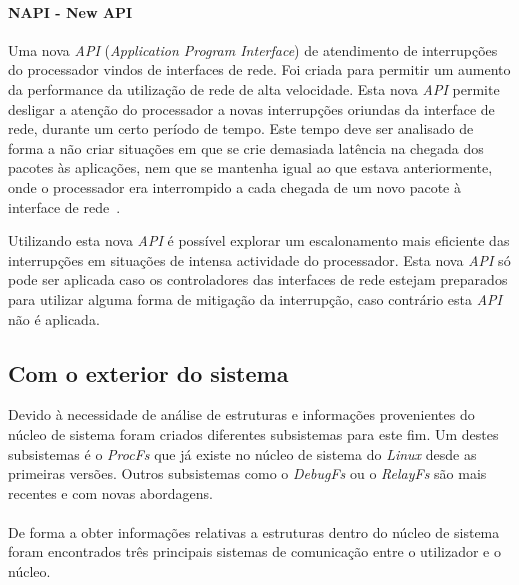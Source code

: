 \paragraph*{NAPI - New API}\label{par:NAPI}

Uma nova \textit{API} (\textit{Application Program Interface}) de atendimento de interrupções do processador vindos de interfaces de rede.
Foi criada para permitir um aumento da performance da utilização de rede de alta velocidade.
Esta nova \textit{API} permite desligar a atenção do processador a novas interrupções oriundas da interface de rede, durante um certo período de tempo.
Este tempo deve ser analisado de forma a não criar situações em que se crie demasiada latência na chegada dos pacotes às aplicações, nem que se mantenha igual ao que estava anteriormente, onde o processador era interrompido a cada chegada de um novo pacote à interface de rede~\cite{administrator:napi}.

Utilizando esta nova \textit{API} é possível explorar um escalonamento mais eficiente das interrupções em situações de intensa actividade do processador.
Esta nova \textit{API} só pode ser aplicada caso os controladores das interfaces de rede estejam preparados para utilizar alguma forma de mitigação da interrupção, caso contrário esta \textit{API} não é aplicada.

\subsection{Com o exterior do sistema}
% 

Devido à necessidade de análise de estruturas e informações provenientes do núcleo de sistema foram criados diferentes subsistemas para este fim.
Um destes subsistemas é o \textit{ProcFs} que já existe no núcleo de sistema do \textit{Linux} desde as primeiras versões.
Outros subsistemas como o \textit{DebugFs} ou o \textit{RelayFs} são mais recentes e com novas abordagens. 

\paragraph*{}
De forma a obter informações relativas a estruturas dentro do núcleo de sistema foram encontrados três principais sistemas de comunicação entre o utilizador e o núcleo.

